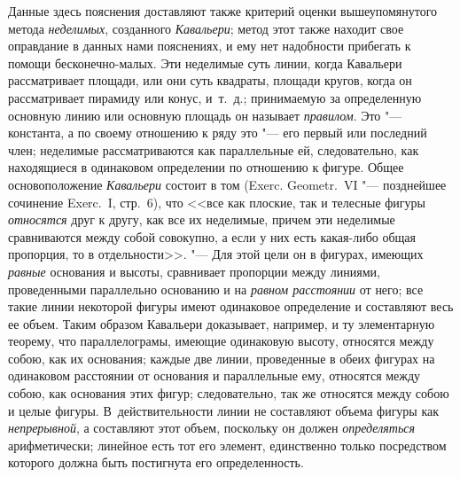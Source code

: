 Данные здесь пояснения доставляют также критерий оценки вышеупомянутого
метода {\em неделимых}, созданного
{\em Кавальери}; метод этот также находит свое
оправдание в данных нами пояснениях, и ему нет надобности прибегать к
помощи бесконечно-малых. Эти неделимые суть линии, когда Кавальери
рассматривает площади, или они суть квадраты, площади кругов, когда он
рассматривает пирамиду или конус, и~т.~д.; принимаемую за определенную
основную линию или основную площадь он называет
{\em правилом}. Это "--- константа, а по своему отношению
к ряду это "--- его первый или последний член; неделимые рассматриваются как
параллельные ей, следовательно, как находящиеся в одинаковом определении по
отношению к фигуре. Общее основоположение
{\em Кавальери} состоит в том (Exerc. Geometr.~VI
"--- позднейшее сочинение Exerc.~I, стр.~6), что <<все как плоские, так и
телесные фигуры {\em относятся} друг к другу, как все
их неделимые, причем эти неделимые сравниваются
между собой совокупно, а если у них есть какая-либо общая пропорция, то в
отдельности>>. "--- Для этой цели он в фигурах, имеющих {\em равные}
основания и высоты, сравнивает пропорции между линиями, проведенными
параллельно основанию и на {\em равном расстоянии} от него; все такие линии
некоторой фигуры имеют одинаковое определение и составляют весь ее объем.
Таким образом Кавальери доказывает, например, и ту элементарную теорему,
что параллелограмы, имеющие одинаковую высоту, относятся между собою, как
их основания; каждые две линии, проведенные в обеих фигурах на одинаковом
расстоянии от основания и параллельные ему, относятся между собою, как
основания этих фигур; следовательно, так же относятся между собою и целые
фигуры. В~действительности линии не составляют объема фигуры как
{\em непрерывной}, а составляют этот объем, поскольку
он должен {\em определяться} арифметически; линейное
есть тот его элемент, единственно только посредством которого должна быть
постигнута его определенность.

